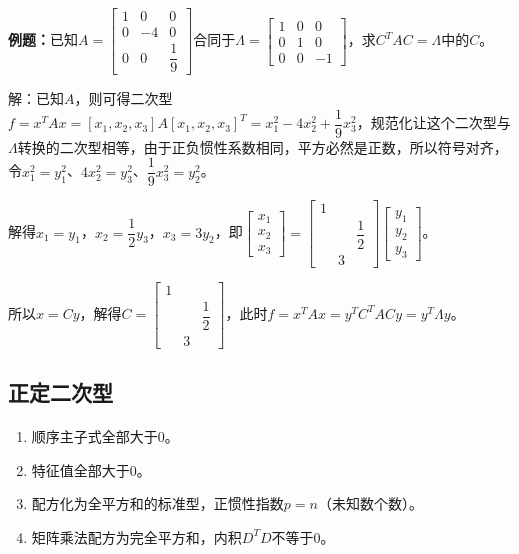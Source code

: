 \textbf{例题：}已知$A=\left[\begin{array}{ccc}
    1 & 0 & 0 \\
    0 & -4 & 0 \\
    0 & 0 & \dfrac{1}{9}
\end{array}\right]$合同于$\Lambda=\left[\begin{array}{ccc}
    1 & 0 & 0 \\
    0 & 1 & 0 \\
    0 & 0 & -1
\end{array}\right]$，求$C^TAC=\Lambda$中的$C$。

解：已知$A$，则可得二次型$f=x^TAx=[x_1,x_2,x_3]A[x_1,x_2,x_3]^T=x_1^2-4x_2^2+\dfrac{1}{9}x_3^2$，规范化让这个二次型与$\Lambda$转换的二次型相等，由于正负惯性系数相同，平方必然是正数，所以符号对齐，令$x_1^2=y_1^2$、$4x_2^2=y_3^2$、$\dfrac{1}{9}x_3^2=y_2^2$。

解得$x_1=y_1$，$x_2=\dfrac{1}{2}y_3$，$x_3=3y_2$，即$\left[\begin{array}{c}
    x_1 \\
    x_2 \\
    x_3
\end{array}\right]=\left[\begin{array}{ccc}
    1 \\
    & & \dfrac{1}{2} \\
    & 3
\end{array}\right]\left[\begin{array}{c}
    y_1 \\
    y_2 \\
    y_3
\end{array}\right]$。

所以$x=Cy$，解得$C=\left[\begin{array}{ccc}
    1 \\
    & & \dfrac{1}{2} \\
    & 3
\end{array}\right]$，此时$f=x^TAx=y^TC^TACy=y^T\Lambda y$。

\subsection{正定二次型}

\paragraph{}

\begin{enumerate}
    \item 顺序主子式全部大于0。
    \item 特征值全部大于0。
    \item 配方化为全平方和的标准型，正惯性指数$p=n$（未知数个数）。
    \item 矩阵乘法配方为完全平方和，内积$D^TD$不等于0。
\end{enumerate}

